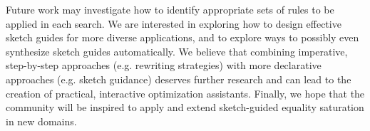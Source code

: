 Future work may investigate how to identify appropriate sets of rules to be applied in each search.
We are interested in exploring how to design effective sketch guides for more diverse applications, and to explore ways to possibly even synthesize sketch guides automatically.
We believe that combining imperative, step-by-step approaches (e.g. rewriting strategies) with more declarative approaches (e.g. sketch guidance) deserves further research and can lead to the creation of practical, interactive optimization assistants.
Finally, we hope that the community will be inspired to apply and extend sketch-guided equality saturation in new domains.


\clearpage